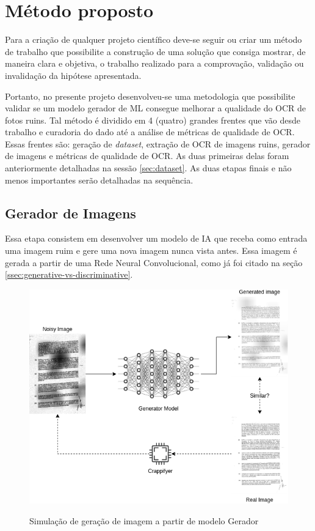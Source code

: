 \section{Método proposto}

Para a criação de qualquer projeto científico deve-se seguir ou criar um método de trabalho que possibilite a construção de uma solução que consiga mostrar, de maneira clara e objetiva, o trabalho realizado para a comprovação, validação ou invalidação da hipótese apresentada.

Portanto, no presente projeto desenvolveu-se uma metodologia que possibilite validar se um modelo gerador de ML consegue melhorar a qualidade do OCR de fotos ruins. Tal método é dividido em 4 (quatro) grandes frentes que vão desde trabalho e curadoria do dado até a análise de métricas de qualidade de OCR. Essas frentes são: geração de \textit{dataset}, extração de OCR de imagens ruins, gerador de imagens e métricas de qualidade de OCR. As duas primeiras delas foram anteriormente detalhadas na sessão \ref{sec:dataset}. As duas etapas finais e não menos importantes serão detalhadas na sequência.

\subsection{Gerador de Imagens}

Essa etapa consistem em desenvolver um modelo de IA que receba como entrada uma imagem ruim e gere uma nova imagem nunca vista antes. Essa imagem é gerada a partir de uma Rede Neural Convolucional, como já foi citado na seção \ref{ssec:generative-vs-discriminative}.

\begin{figure}[H]
  \centering
  \caption{Simulação de geração de imagem a partir de modelo Gerador}
  \includegraphics[scale=0.6]{figuras/image-generation.png}
  \label{fig:image-generation}
\end{figure}

